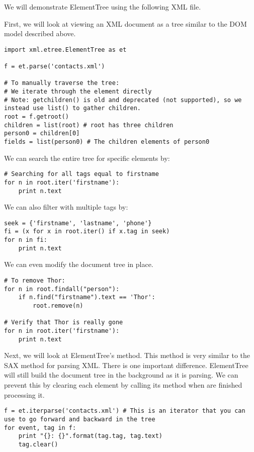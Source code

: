 We will demonstrate ElementTree using the following XML file.


First, we will look at viewing an XML document as a tree similar to the DOM model described above.

\begin{lstlisting}
import xml.etree.ElementTree as et

f = et.parse('contacts.xml')

# To manually traverse the tree:
# We iterate through the element directly
# Note: getchildren() is old and deprecated (not supported), so we instead use list() to gather children.
root = f.getroot()
children = list(root) # root has three children
person0 = children[0]
fields = list(person0) # The children elements of person0
\end{lstlisting}

We can search the entire tree for specific elements by:

\begin{lstlisting}
# Searching for all tags equal to firstname
for n in root.iter('firstname'):
    print n.text
\end{lstlisting}

We can also filter with multiple tags by:

\begin{lstlisting}
seek = {'firstname', 'lastname', 'phone'}
fi = (x for x in root.iter() if x.tag in seek)
for n in fi:
    print n.text
\end{lstlisting}

We can even modify the document tree in place.

\begin{lstlisting}
# To remove Thor:
for n in root.findall("person"):
    if n.find("firstname").text == 'Thor':
        root.remove(n)

# Verify that Thor is really gone
for n in root.iter('firstname'):
    print n.text
\end{lstlisting}

Next, we will look at ElementTree's  method.
This method is very similar to the SAX method for parsing XML.
There is one important difference.
ElementTree will still build the document tree in the background as it is parsing.
We can prevent this by clearing each element by calling its  method when are finished processing it.

\begin{lstlisting}
f = et.iterparse('contacts.xml') # This is an iterator that you can use to go forward and backward in the tree
for event, tag in f:
    print "{}: {}".format(tag.tag, tag.text)
    tag.clear()
\end{lstlisting}

